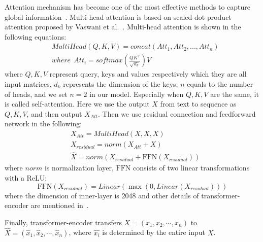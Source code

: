 Attention mechanism has become one of the most effective methods to capture global information~\cite{attentionInMulTask,attentionInNLP,vaswani2017Transformer}. Multi-head attention is based on scaled dot-product attention proposed by Vaswani et al.~\cite{vaswani2017Transformer}. Multi-head attention is shown in the following equations:
\begin{equation}
	\begin{split}
		&MultiHead(Q,K,V)=concat(Att_1,Att_2,...,Att_n)\\
		&where \ \ Att_i =softmax(\frac{QK^T}{\sqrt{d_k}})V
	\end{split}
\label{attention}
\end{equation}
where $Q,K,V$ represent query, keys and values respectively which they are all input matrices, $d_k$ represents the dimension of the keys, $n$ equals to the number of heads, and we set $n=2$ in our model. Especially when $Q,K,V$ are the same, it is called self-attention. Here we use the output $X$ from text to sequence as $Q,K,V$, and then output $X_{Att}$. Then we use residual connection and feedforward network  in the following:
\begin{equation}
	\begin{split}
	    &X_{Att} = MultiHead(X,X,X)\\
		&X_{residual} = norm(X_{Att} + X)\\
		&\hat{X} = norm(X_{residual}+\text{FFN}(X_{residual}))
	\end{split}
\label{equation:T-E}
\end{equation}
where $norm$ is normalization layer, $\text{FFN}$ consists of two linear transformations with a ReLU:
\begin{equation}
	\text{FFN}(X_{residual}) = Linear(\max(0,Linear(X_{residual})))
\end{equation}
where the dimension of inner-layer is 2048 and other details of transformer-encoder are mentioned in~\cite{vaswani2017Transformer}.

Finally, transformer-encoder transfers $X = (x_1,x_2,\cdots,x_n)$ to  $\hat{X} = (\hat{x}_1,\hat{x}_2,\cdots ,\hat{x}_n)$, where $\hat{x_i}$ is determined by the entire input $X$.


